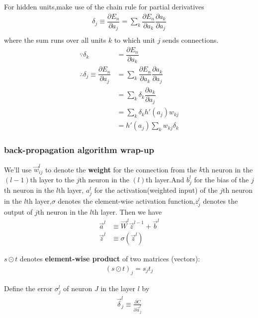 For hidden units,make use of the chain rule for partial derivatives
\begin{align}
    \delta_j\equiv \dfrac{\partial E_n}{\partial a_j}=
    \sum_k \dfrac{\partial E_n}{\partial a_k}\dfrac{\partial a_k}{\partial a_j} \\
\end{align}
where the sum runs over all units $k$ to which unit $j$ sends connections.
\begin{align}
    \because \delta_k &= \dfrac{\partial E_n}{\partial a_k}\\
    \therefore
    \delta_j\equiv \dfrac{\partial E_n}{\partial a_j} &=
    \sum_k \dfrac{\partial E_n}{\partial a_k}\dfrac{\partial a_k}{\partial a_j} \\
    &=\sum_k \delta_k\dfrac{\partial a_k}{\partial a_j} \\
    &=\sum_k \delta_k h'(a_j)w_{kj} \\
    &= h'(a_j)\sum_k w_{kj}\delta_k
\end{align}

\subsubsection{back-propagation algorithm wrap-up}

We'll use $\vec{w}_{ij}^{l}$ to denote the \textbf{weight} for the connection from the $k$th neuron in the $(l-1)$th layer to the $j$th neuron in the $(l)$th layer.And $b_j^l$  for the bias of the $j$th neuron in the $l$th layer, $a_j^l$ for the activation(weighted input) of the $j$th neuron in the $l$th layer,$\sigma$ denotes the element-wise activation function,$z_j^l$ denotes the output of $j$th neuron in the $l$th layer.
Then we have
\begin{align}
	\vec{a}^l &\equiv \vec{W}^l \vec{z}^{l-1}+\vec{b}^l \\
	\vec{z}^{l} &\equiv \sigma(\vec{z}^{l})
\end{align}

$s\odot t$ denotes \textbf{element-wise product} of two matrices (vectors):
\begin{align}
(s\odot t)_j = s_jt_j
\end{align}

Define the error $\sigma_j^l$ of neuron $J$ in the layer $l$ by
\begin{align}
\vec{\delta}^l_j \equiv \frac{\partial C}{\partial \vec{a}^l_j}
\end{align}

